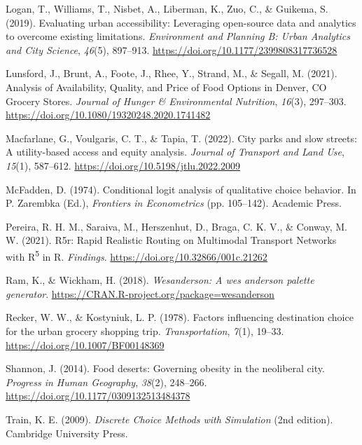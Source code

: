 \documentclass[
  letterpaper,
  number,
  review,
  3p]{elsarticle}
\newlength{\cslhangindent}
\newenvironment{CSLReferences}[2] %
 {\begin{list}{}{%
  \setlength{\itemindent}{0pt}
  \setlength{\leftmargin}{0pt}
  \setlength{\parsep}{0pt}
  \ifodd #1
   \setlength{\leftmargin}{\cslhangindent}
   \setlength{\itemindent}{-1\cslhangindent}
  \fi
  \setlength{\itemsep}{#2\baselineskip}}}
 {\end{list}}
\begin{document}
\begin{CSLReferences}{1}{0}
Logan, T., Williams, T., Nisbet, A., Liberman, K., Zuo, C., \& Guikema,
S. (2019). Evaluating urban accessibility: Leveraging open-source data
and analytics to overcome existing limitations. \emph{Environment and
Planning B: Urban Analytics and City Science}, \emph{46}(5), 897--913.
\url{https://doi.org/10.1177/2399808317736528}

Lunsford, J., Brunt, A., Foote, J., Rhee, Y., Strand, M., \& Segall, M.
(2021). Analysis of {Availability}, {Quality}, and {Price} of {Food
Options} in {Denver}, {CO Grocery Stores}. \emph{Journal of Hunger \&
Environmental Nutrition}, \emph{16}(3), 297--303.
\url{https://doi.org/10.1080/19320248.2020.1741482}

Macfarlane, G., Voulgaris, C. T., \& Tapia, T. (2022). City parks and
slow streets: {A} utility-based access and equity analysis.
\emph{Journal of Transport and Land Use}, \emph{15}(1), 587--612.
\url{https://doi.org/10.5198/jtlu.2022.2009}

McFadden, D. (1974). Conditional logit analysis of qualitative choice
behavior. In P. Zarembka (Ed.), \emph{Frontiers in {Econometrics}} (pp.
105--142). Academic Press.

Pereira, R. H. M., Saraiva, M., Herszenhut, D., Braga, C. K. V., \&
Conway, M. W. (2021). R5r: {Rapid Realistic Routing} on {Multimodal
Transport Networks} with {R}{\textsuperscript{5}} in {R}.
\emph{Findings}. \url{https://doi.org/10.32866/001c.21262}

Ram, K., \& Wickham, H. (2018). \emph{Wesanderson: A wes anderson
palette generator}. \url{https://CRAN.R-project.org/package=wesanderson}

Recker, W. W., \& Kostyniuk, L. P. (1978). Factors influencing
destination choice for the urban grocery shopping trip.
\emph{Transportation}, \emph{7}(1), 19--33.
\url{https://doi.org/10.1007/BF00148369}

Shannon, J. (2014). Food deserts: {Governing} obesity in the neoliberal
city. \emph{Progress in Human Geography}, \emph{38}(2), 248--266.
\url{https://doi.org/10.1177/0309132513484378}

Train, K. E. (2009). \emph{Discrete {Choice Methods} with {Simulation}}
(2nd edition). Cambridge University Press.


\end{CSLReferences}
\end{document}
